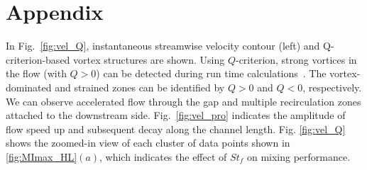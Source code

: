 \documentclass[%
aip,
amsmath,amssymb,
reprint,
]{revtex4-1}
\begin{document}
			
			
			
			
			\clearpage
			\newpage
			
			\section*{Appendix}
			\appendix
			
			\onecolumngrid
			In Fig.~\ref{fig:vel_Q}, instantaneous streamwise velocity contour (left) and Q-criterion-based vortex structures are shown. Using $Q$-criterion, strong vortices in the flow (with $Q>0$) can be detected during run time calculations~\cite{Hunt1994, Hussain1995, Holmes2012, Rowley2014}. The vortex-dominated and strained zones can be identified by $Q>0$ and $Q<0$, respectively. We can observe accelerated flow through the gap and multiple recirculation zones attached to the downstream side. Fig.~\ref{fig:vel_pro} indicates the amplitude of flow speed up and subsequent decay along the channel length. Fig. \ref{fig:vel_Q} shows the zoomed-in view of each cluster of data points shown in \ref{fig:MImax_HL}$(a)$, which indicates the effect of $St_f$ on mixing performance.
\end{document}
